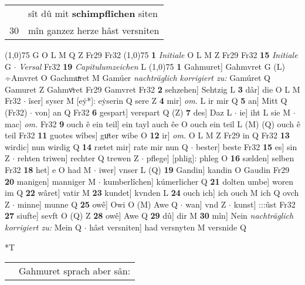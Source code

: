 \documentclass[8pt,a4paper,notitlepage]{article}
\begin{document}
\begin{table}[ht]
\begin{minipage}[t]{0.5\linewidth}
\begin{tabular}{rl}
 & sît dû mit \textbf{schimpflîchen} siten\\ 
30 & mîn ganzez herze hâst versniten\\ 
\end{tabular}
\scriptsize
\line(1,0){75} \newline
G O L M Q Z Fr29 Fr32 \newline
\line(1,0){75} \newline
\textbf{1} \textit{Initiale} O L M Z Fr29 Fr32  \textbf{15} \textit{Initiale} G   $\cdot$ \textit{Versal} Fr32  \textbf{19} \textit{Capitulumzeichen} L  \newline
\line(1,0){75} \newline
\textbf{1} Gahmuret] Gahmvret G (L) ÷Amvret O Gachmuͯret M Gamúer \textit{nachträglich korrigiert zu:} Gamúret Q Gamuret Z Gahmvͦret Fr29 Gamvret Fr32 \textbf{2} sehzehen] Sehtzig L \textbf{3} dâr] die O L M Fr32  $\cdot$ îser] syser M [eẏ*]: eẏserin Q sere Z \textbf{4} mir] \textit{om.} L ir mir Q \textbf{5} an] Mitt Q (Fr32)  $\cdot$ von] an Q Fr32 \textbf{6} gespart] verspart Q (Z) \textbf{7} des] Daz L  $\cdot$ ie] iht L sie M  $\cdot$ mac] \textit{om.} Fr32 \textbf{9} ouch ê ein teil] ein tayl auch êe O ouch ein teil L (M) (Q) ouch ê teil Fr32 \textbf{11} guotes wîbes] guͦter wibe O \textbf{12} ir] \textit{om.} O L M Z Fr29 in Q Fr32 \textbf{13} wirdic] nun wirdig Q \textbf{14} rætet mir] rate mir nun Q  $\cdot$ bester] beste Fr32 \textbf{15} es] sin Z  $\cdot$ rehten triwen] rechter Q trewen Z  $\cdot$ pflege] [phlig]: phleg O \textbf{16} sælden] selben Fr32 \textbf{18} het] e O had M  $\cdot$ iwer] vnser L (Q) \textbf{19} Gandin] kandin O Gaudin Fr29 \textbf{20} manigen] manniger M  $\cdot$ kumberlîchen] kúmerlicher Q \textbf{21} dolten umbe] woren im Q \textbf{22} wâret] vatir M \textbf{23} kundet] kvnden L \textbf{24} ouch ich] ich ouch M ich Q ovch Z  $\cdot$ minne] munne Q \textbf{25} owê] Owi O (M) Awe Q  $\cdot$ wan] vnd Z  $\cdot$ kunst] :::ûst Fr32 \textbf{27} siufte] sevft O (Q) Z \textbf{28} owê] Awe Q \textbf{29} dû] dir M \textbf{30} mîn] Nein \textit{nachträglich korrigiert zu:} Mein Q  $\cdot$ hâst versniten] had versnyten M versnide Q \newline
\end{minipage}
\hspace{0.5cm}
\begin{minipage}[t]{0.5\linewidth}
\small
\begin{center}*T
\end{center}
\begin{tabular}{rl}
 & Gahmuret sprach aber sân:\\ 

\end{tabular}
\end{minipage}
\end{table}
\end{document}
